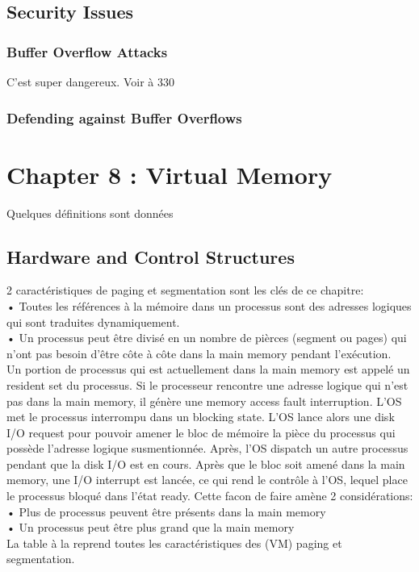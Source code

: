 \subsection{Security Issues}
\subsubsection{Buffer Overflow Attacks}
C'est super dangereux.
Voir \cite[p.~327]{stallings} à 330
\subsubsection{Defending against Buffer Overflows}

\newpage


\section{Chapter 8 : Virtual Memory}

Quelques définitions sont données \cite[p.~341]{stallings}
\subsection{Hardware and Control Structures}
2 caractéristiques de paging et segmentation sont les clés de ce chapitre: \\
• Toutes les références à la mémoire dans un processus sont des adresses logiques qui sont traduites dynamiquement.\\
• Un processus peut être divisé en un nombre de pièrces (segment ou pages) qui n'ont pas besoin d'être côte à côte dans la main memory pendant l'exécution.\\
Un portion de processus qui est actuellement dans la main memory est appelé un resident set du processus.
Si le processeur rencontre une adresse logique qui n'est pas dans la main memory, il génère une memory access fault interruption.
L'OS met le processus interrompu dans un blocking state.
L'OS lance alors une disk I/O request pour pouvoir amener le bloc de mémoire la pièce du processus qui possède l'adresse logique susmentionnée.
Après, l'OS dispatch un autre processus pendant que la disk I/O est en cours.
Après que le bloc soit amené dans la main memory, une I/O interrupt est lancée, ce qui rend le contrôle à l'OS, lequel place le processus bloqué dans l'état ready.
Cette facon de faire amène 2 considérations:\\
• Plus de processus peuvent être présents dans la main memory \\
• Un processus peut être plus grand que la main memory\\
La table à la \cite[p.~343]{stallings} reprend toutes les caractéristiques des (VM) paging et segmentation.
